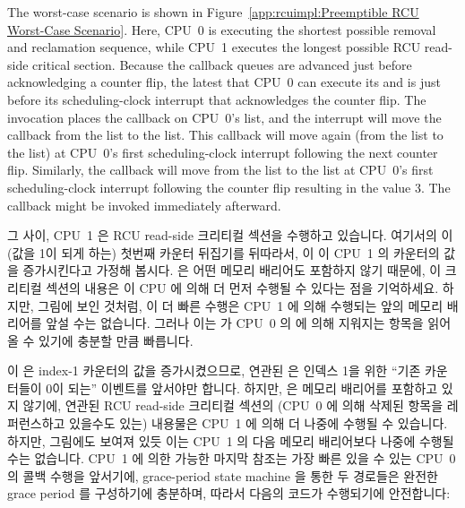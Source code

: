 The worst-case scenario is shown in
Figure~\ref{app:rcuimpl:Preemptible RCU Worst-Case Scenario}.
Here, CPU~0 is executing the shortest possible
removal and reclamation sequence,
while CPU~1 executes the longest possible RCU read-side critical
section.
Because the callback queues are advanced just before acknowledging a
counter flip, the latest that CPU~0 can execute its
 and  is just before
its scheduling-clock interrupt that acknowledges the counter flip.
The  invocation places the callback on CPU~0's
 list, and the interrupt will move the callback from
the  list to the  list.
This callback will move again (from the  list
to the  list) at CPU~0's first scheduling-clock
interrupt following the next counter flip.
Similarly, the callback will move from the  list
to the  list at CPU~0's first scheduling-clock
interrupt following the counter flip resulting in the value 3.
The callback might be invoked immediately afterward.
\fi

그 사이, CPU~1 은 RCU read-side 크리티컬 섹션을 수행하고 있습니다.
여기서의  이 (값을 1이 되게 하는) 첫번째 카운터 뒤집기를
뒤따라서, 이  이 CPU~1 의  카운터의 값을
증가시킨다고 가정해 봅시다.
 은 어떤 메모리 배리어도 포함하지 않기 때문에, 이 크리티컬
섹션의 내용은 이 CPU 에 의해 더 먼저 수행될 수 있다는 점을 기억하세요.
하지만, 그림에 보인 것처럼, 이 더 빠른 수행은 CPU~1 에 의해 수행되는 앞의
메모리 배리어를 앞설 수는 없습니다.
그러나 이는  가 CPU~0 의  에 의해
지워지는 항목을 읽어올 수 있기에 충분할 만큼 빠릅니다.

이  은 index-1 카운터의 값을 증가시켰으므로, 연관된
 은 인덱스 1을 위한 ``기존 카운터들이 0이 되는'' 이벤트를
앞서야만 합니다.
하지만,  은 메모리 배리어를 포함하고 있지 않기에, 연관된
RCU read-side 크리티컬 섹션의 (CPU~0 에 의해 삭제된 항목을 레퍼런스하고
있을수도 있는) 내용물은 CPU~1 에 의해 더 나중에 수행될 수 있습니다.
하지만, 그림에도 보여져 있듯 이는 CPU~1 의 다음 메모리 배리어보다 나중에 수행될
수는 없습니다.
CPU~1 에 의한 가능한 마지막 참조는 가장 빠른 있을 수 있는 CPU~0 의 콜백 수행을
앞서기에, grace-period state machine 을 통한 두 경로들은 완전한 grace period 를
구성하기에 충분하며, 따라서 다음의 코드가 수행되기에 안전합니다:
\iffalse

